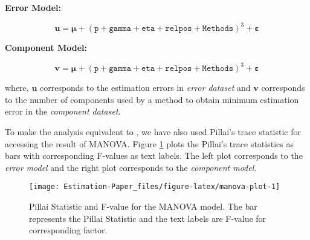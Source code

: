 \documentclass[12pt,3p,authoryear]{elsarticle}
\begin{document}
\textbf{Error Model:}

\begin{equation}
  \mathbf{u} = \boldsymbol{\mu} +
  (\texttt{p} + \texttt{gamma} + \texttt{eta} +
    \texttt{relpos} + \texttt{Methods})^3 +
    \boldsymbol{\varepsilon}
  \label{eq:err-model}
\end{equation}

\textbf{Component Model:}

\begin{equation}
  \mathbf{v} = \boldsymbol{\mu} +
  (\texttt{p} + \texttt{gamma} + \texttt{eta} +
    \texttt{relpos} + \texttt{Methods})^3 +
    \boldsymbol{\varepsilon}
  \label{eq:comp-model}
\end{equation}

where, \(\mathbf{u}\) corresponds to the estimation errors in
\emph{error dataset} and \(\mathbf{v}\) corresponds to the number of
components used by a method to obtain minimum estimation error in the
\emph{component dataset}.

To make the analysis equivalent to \citet{rimal2019pred}, we have also
used Pillai's trace statistic for accessing the result of MANOVA. Figure
\ref{fig:manova-plot} plots the Pillai's trace statistics as bars with
corresponding F-values as text labels. The left plot corresponds to the
\emph{error model} and the right plot corresponds to the \emph{component
model}.





\begin{figure}
\texttt{[image: Estimation-Paper\_files/figure-latex/manova-plot-1]} \caption{Pillai Statistic and F-value for the MANOVA model. The
bar represents the Pillai Statistic and the text labels are F-value for
corresponding factor.}\label{fig:manova-plot}
\end{figure}
\end{document}

